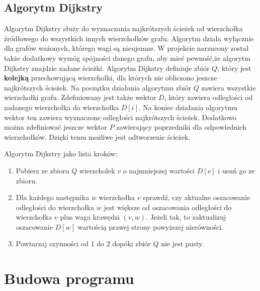 \documentclass{article}
\begin{document}
\newpage

\subsection{Algorytm Dijkstry}
Algorytm Dijkstry służy do wyznaczania najkrótszych ścieżek od wierzchołka źródłowego do wszystkich innych wierzchołków grafu. Algorytm działa wyłącznie dla grafów ważonych, którego wagi są nieujemne. W projekcie narzucony został także dodatkowy wymóg spójności danego grafu, aby mieć pewność,\linebreak że algorytm Dijkstry znajdzie zadane ścieżki. Algorytm Dijkstry definiuje zbiór $Q$, który jest \textbf{kolejką} przechowującą wierzchołki, dla których nie obliczono jeszcze najkrótszych ścieżek. Na początku działania algorytmu zbiór $Q$ zawiera wszystkie wierzchołki grafu. Zdefiniowany jest także wektor $D$, który zawiera odległości od zadanego wierzchołka do wierzchołka $D[i]$. Na koniec działania algorytmu wektor ten zawiera wyznaczone odległości najkrótszych ścieżek. Dodatkowo można zdefiniować jeszcze wektor $P$ zawierający poprzedniki \linebreak dla odpowiednich wierzchołków. Dzięki temu możliwe jest odtworzenie ścieżek.

\medskip

\noindent Algorytm Dijkstry jako lista kroków:
\begin{enumerate}
    \item Pobierz ze zbioru $Q$ wierzchołek $v$ o najmniejszej wartości $D[v]$ i usuń go ze zbioru.
    \item Dla każdego następnika $w$ wierzchołka $v$ sprawdź, czy aktualne oszacowanie odległości do wierzchołka $w$ jest większe od oszacowania odległości \linebreak do wierzchołka $v$ plus waga krawędzi $(v, w)$.
    Jeżeli tak, to zaktualizuj oszacowanie $D[w]$ wartością prawej strony powyższej nierówności.
    \item Powtarzaj czynności od 1 do 2 dopóki zbiór $Q$ nie jest pusty.
\end{enumerate}

\newpage

\section{Budowa programu}
\end{document}
